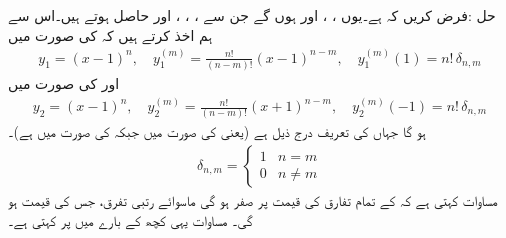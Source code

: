 حل :فرض کریں کہ  ہے۔یوں ، ،  اور  ہوں گے جن  سے ، ، ،  اور  حاصل ہوتے ہیں۔اس سے ہم اخذ کرتے ہیں کہ  کی صورت میں
\begin{align}\label{مساوات_بیسل_سوال_عمومی_الف}
y_1=(x-1)^n,\quad y_1^{(m)}=\frac{n!}{(n-m)!}(x-1)^{n-m},\quad y_1^{(m)}(1)=n! \,\delta_{n,m}
\end{align}
اور  کی صورت میں
\begin{align}\label{مساوات_بیسل_سوال_عمومی_ب}
y_2=(x-1)^n,\quad y_2^{(m)}=\frac{n!}{(n-m)!}(x+1)^{n-m},\quad y_2^{(m)}(-1)=n! \,\delta_{n,m}
\end{align}
ہو گا جہاں  کی تعریف درج ذیل ہے (یعنی  کی صورت میں  جبکہ  کی صورت میں  ہے)۔ 
\begin{align}\label{مساوات_بیسل_کرونیکر_الف}
\delta_{n,m}=
\begin{cases}
1& n=m\\
0&n \ne m
\end{cases}
\end{align}
مساوات  کہتی ہے کہ  کے تمام تفارق کی قیمت  پر صفر ہو گی ماسوائے  رتبی تفرق، جس کی قیمت  ہو گی۔  مساوات  یہی کچھ  کے بارے میں  پر کہتی ہے۔


